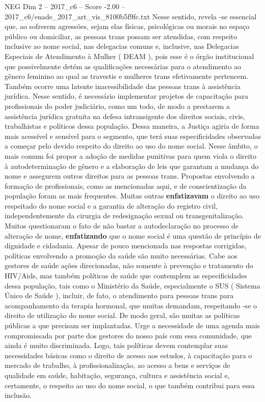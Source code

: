 \begin{textsample}{NEG Dim 2 – 2017\_c6 – Score -2.00 – 2017\_c6/enade\_2017\_art\_vis\_8100b5f9fc.txt}
Nesse sentido, revela -se essencial que, ao sofrerem agressões, sejam elas físicas, psicológicas ou morais no espaço público ou domiciliar, as pessoas trans possam ser atendidas, com respeito inclusive ao nome social, nas delegacias comuns e, inclusive, nas Delegacias Especiais de Atendimento à Mulher ( DEAM ), pois esse é o órgão institucional que possivelmente detém as qualificações necessárias para o atendimento ao gênero feminino ao qual as travestis e mulheres trans efetivamente pertencem.
Também ocorre uma latente inacessibilidade das pessoas trans à assistência jurídica.
Nesse sentido, é necessário implementar projetos de capacitação para profissionais do poder judiciário, como um todo, de modo a prestarem a assistência jurídica gratuita na defesa intransigente dos direitos sociais, civis, trabalhistas e políticos dessa população.
Dessa maneira, a Justiça agiria de forma mais acessível e sensível para o segmento, que terá suas especificidades observadas a começar pelo devido respeito do direito ao uso do nome social.
Nesse âmbito, o mais comum foi propor a adoção de medidas punitivas para quem viola o direito à autodeterminação de gênero e a elaboração de leis que garantam a mudança do nome e assegurem outros direitos para as pessoas trans.
Propostas envolvendo a formação de profissionais, como as mencionadas aqui, e de conscientização da população foram as mais frequentes.
Muitas outras \textbf{enfatizavam} o direito ao uso respeitado do nome social e a garantia de alteração do registro civil, independentemente da cirurgia de redesignação sexual ou transgenitalização.
Muitos questionaram o fato de não bastar a autodeclaração no processo de alteração de nome, \textbf{enfatizando} que o nome social é uma questão de princípio de dignidade e cidadania.
Apesar de pouco mencionada nas respostas corrigidas, políticas envolvendo a promoção da saúde são muito necessárias.
Cabe aos gestores de saúde ações direcionadas, não somente à prevenção e tratamento do HIV/Aids, mas também políticas de saúde que contemplem as especificidades dessa população, tais como o Ministério da Saúde, especialmente o SUS ( Sistema Único de Saúde ), incluir, de fato, o atendimento para pessoas trans para acompanhamento da terapia hormonal, que muitas demandam, respeitando -se o direito de utilização do nome social.
De modo geral, são muitas as políticas públicas a que precisam ser implantadas.
Urge a necessidade de uma agenda mais compromissada por parte dos gestores do nosso país com essa comunidade, que ainda é muito discriminada.
Logo, tais políticas devem contemplar suas necessidades básicas como o direito de acesso aos estudos, à capacitação para o mercado de trabalho, à profissionalização, ao acesso a bens e serviços de qualidade em saúde, habitação, segurança, cultura e assistência social e, certamente, o respeito ao uso do nome social, o que também contribui para essa inclusão.

\end{textsample}
